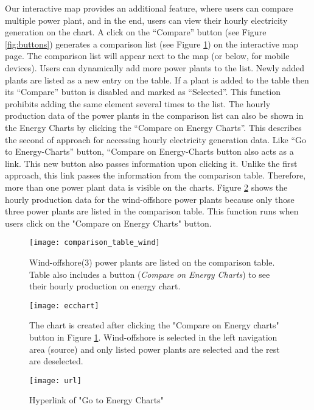 Our interactive map provides an additional feature, where users can compare multiple power plant, and in the end, users can view their hourly electricity generation on the chart. A click on the “Compare” button (see Figure \ref{fig:buttons}) generates a comparison list (see Figure \ref{fig:ctable}) on the interactive map page. The comparison list will appear next to the map (or below, for mobile devices). Users can dynamically add more power plants to the list. Newly added plants are listed as a new entry on the table. If a plant is added to the table then its “Compare” button is disabled and marked as “Selected”. This function prohibits adding the same element several times to the list. The hourly production data of the power plants in the comparison list can also be shown in the Energy Charts by clicking the “Compare on Energy Charts”. This describes the second of approach for accessing hourly electricity generation data. Like “Go to Energy-Charts” button, “Compare on Energy-Charts button also acts as a link. This new button also passes information upon clicking it. Unlike the first approach, this link passes the information from the comparison table. Therefore, more than one power plant data is visible on the charts. Figure \ref{fig:eccharts} shows the hourly production data for the wind-offshore power plants because only those three power plants are listed in the comparison table. This function runs when users click on the "Compare on Energy Charts" button. 

\begin{figure} [H]
\centering
\texttt{[image: comparison\_table\_wind]}
\caption[Wind-offshore(3) power plants are listed on the comparison table]{Wind-offshore(3) power plants are listed on the comparison table. Table also includes a button (\textit{Compare on Energy Charts}) to see their hourly production on energy chart.}
\label{fig:ctable}
\end{figure}

\begin{figure}
\centering
\texttt{[image: ecchart]}
\caption[Energy Chart showing the hourly production data]{The chart is created after clicking the "Compare on Energy charts" button in Figure \ref{fig:ctable}. Wind-offshore is selected in the left navigation area (source) and only listed power plants are selected and the rest are deselected.}
\label{fig:eccharts}
\end{figure}

\begin{figure}
\centering
\texttt{[image: url]}
\caption{Hyperlink of "Go to Energy Charts"}
\label{fig:url}
\end{figure}

